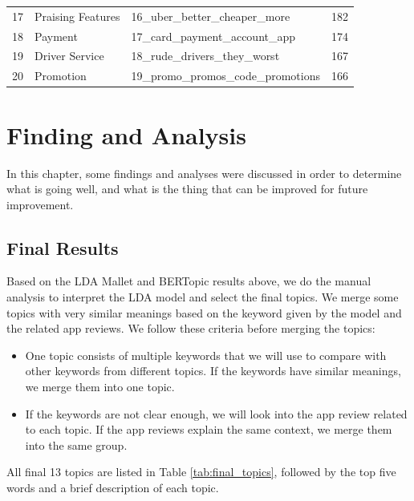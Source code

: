 \documentclass[12pt]{article}
\begin{document}
\begin{table}[!h]
\begin{tabular}{llll}
17          & Praising Features & 16\_uber\_better\_cheaper\_more            & 182             \\
18          & Payment           & 17\_card\_payment\_account\_app            & 174             \\
19          & Driver Service    & 18\_rude\_drivers\_they\_worst             & 167             \\
20          & Promotion         & 19\_promo\_promos\_code\_promotions        & 166   \\
\hline
\end{tabular}
\label{tab:bertopic_result}
\end{table}

\clearpage
\newpage
\section{Finding and Analysis}
In this chapter, some findings and analyses were discussed in order to determine what is going well, and what is the thing that can be improved for future improvement.

\subsection{Final Results}
Based on the LDA Mallet and BERTopic results above, we do the manual analysis to interpret the LDA model and select the final topics. We merge some topics with very similar meanings based on the keyword given by the model and the related app reviews. We follow these criteria before merging the topics:

\begin{itemize}
\item One topic consists of multiple keywords that we will use to compare with other keywords from different topics. If the keywords have similar meanings, we merge them into one topic.
\item If the keywords are not clear enough, we will look into the app review related to each topic. If the app reviews explain the same context, we merge them into the same group.
\end{itemize}

All final 13 topics are listed in Table \ref{tab:final_topics}, followed by the top five words and a brief description of each topic.
\end{document}
